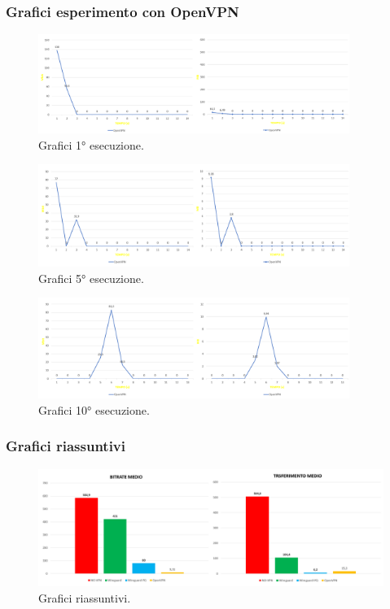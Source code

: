 \newpage
\subsubsection{Grafici esperimento con OpenVPN}

\begin{figure}[h] \includegraphics[width=0.9\textwidth] {Tesi magistrale/capitoli/images/10.png}
\centering
\caption{Grafici 1° esecuzione.}
\end{figure}

\begin{figure}[h] \includegraphics[width=0.9\textwidth] {Tesi magistrale/capitoli/images/11.png}
\centering
\caption{Grafici 5° esecuzione.}
\end{figure}

\begin{figure}[h] \includegraphics[width=0.9\textwidth] {Tesi magistrale/capitoli/images/12.png}
\centering
\caption{Grafici 10° esecuzione.}
\end{figure}

\newpage
\subsubsection{Grafici riassuntivi}

\begin{figure}[h] \includegraphics[width=1\textwidth] {Tesi magistrale/capitoli/images/13.png}
\centering
\caption{Grafici riassuntivi.}
\end{figure}

